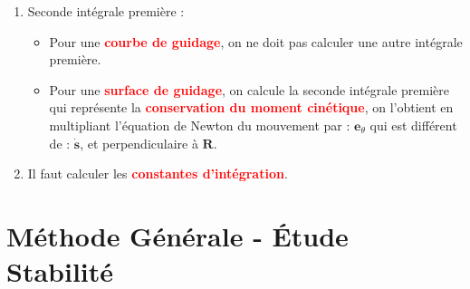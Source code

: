 \documentclass[a4paper]{article}
\begin{document}
\begin{enumerate}
\item Seconde intégrale première : 
\begin{itemize}
    \item Pour une \textcolor{red}{\textbf{courbe de guidage}}, on ne doit pas calculer une autre intégrale première.

    \item Pour une \textcolor{red}{\textbf{surface de guidage}}, on calcule la seconde intégrale première qui représente la \textcolor{red}{\textbf{conservation du moment cinétique}}, on l'obtient en multipliant l'équation de Newton du mouvement par : $ \textbf{e}_\theta $ qui est différent de : $ \dot{\textbf{s}} $, et perpendiculaire à $ \textbf{R} $.
\end{itemize}





\item Il faut calculer les \textcolor{red}{\textbf{constantes d'intégration}}.





\end{enumerate}










\section{Méthode Générale - Étude Stabilité}
\end{document}
